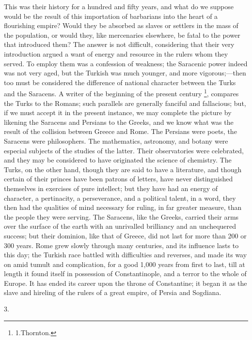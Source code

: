 This was their history for a
hundred and fifty years, and what do we suppose would be the result of
this importation of barbarians into the heart of a flourishing empire?
Would they be absorbed as slaves or settlers in the mass of the
population, or would they, like mercenaries elsewhere, be fatal to the
power that introduced them? The answer is not difficult, considering
that their very introduction argued a want of energy and resource in
the rulers whom they served. To employ them was a confession of
weakness; the Saracenic power indeed was not very aged, but the
Turkish was much younger, and more vigorous;—then too must be
considered the difference of national character between the Turks and
the Saracens. A writer of the beginning of the present century \footnote{1.Thornton.}, compares the Turks to the Romans; such parallels are generally
fanciful and fallacious; but, if we must accept it in the present
instance, we may complete the picture by likening the Saracens and
Persians to the Greeks, and we know what was the result of the
collision between Greece and Rome. The Persians were poets, the
Saracens were philosophers. The mathematics, astronomy, and botany
were especial subjects of the studies of the latter. Their
observatories were celebrated, and they may be considered to have
originated the science of chemistry. The Turks, on the other hand,
though they are said to have a literature, and though certain of their
princes have been patrons of letters, have never distinguished
themselves in exercises of pure intellect; but they have had an energy
of character, a pertinacity, a perseverance, and a political talent,
in a word, they then had the qualities of mind necessary for ruling,
in far greater measure, than the people they were serving. The
Saracens, like the Greeks, carried their arms over the surface of the
earth with an unrivalled brilliancy and an unchequered success; but
their dominion, like that of Greece, did not last for more than 200 or
300 years. Rome grew slowly through many centuries, and its influence
lasts to this day; the Turkish race battled with difficulties and
reverses, and made its way on amid tumult and complication, for a good
1,000 years from first to last, till at length it found itself in
possession of Constantinople, and a terror to the whole of Europe. It
has ended its career upon the throne of Constantine; it began it as
the slave and hireling of the rulers of a great empire, of Persia and
Sogdiana.

3.

